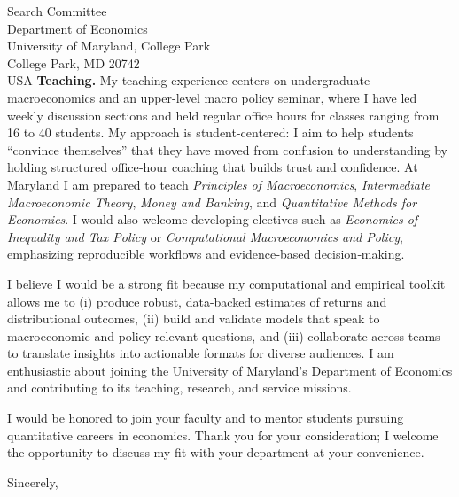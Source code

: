 \documentclass[11pt,letterpaper]{letter}
\begin{document}
\begin{letter}{Search Committee \\
Department of Economics \\
University of Maryland, College Park \\
College Park, MD 20742 \\ USA}
\textbf{Teaching.} My teaching experience centers on undergraduate macroeconomics and an upper-level macro policy seminar, where I have led weekly discussion sections and held regular office hours for classes ranging from 16 to 40 students. My approach is student-centered: I aim to help students “convince themselves” that they have moved from confusion to understanding by holding structured office‐hour coaching that builds trust and confidence. At Maryland I am prepared to teach \textit{Principles of Macroeconomics}, \textit{Intermediate Macroeconomic Theory}, \textit{Money and Banking}, and \textit{Quantitative Methods for Economics}. I would also welcome developing electives such as \textit{Economics of Inequality and Tax Policy} or \textit{Computational Macroeconomics and Policy}, emphasizing reproducible workflows and evidence‐based decision‐making.

I believe I would be a strong fit because my computational and empirical toolkit allows me to (i) produce robust, data-backed estimates of returns and distributional outcomes, (ii) build and validate models that speak to macroeconomic and policy‐relevant questions, and (iii) collaborate across teams to translate insights into actionable formats for diverse audiences. I am enthusiastic about joining the University of Maryland’s Department of Economics and contributing to its teaching, research, and service missions.

I would be honored to join your faculty and to mentor students pursuing quantitative careers in economics. Thank you for your consideration; I welcome the opportunity to discuss my fit with your department at your convenience.

\closing{Sincerely,}

\end{letter}
\end{document}
